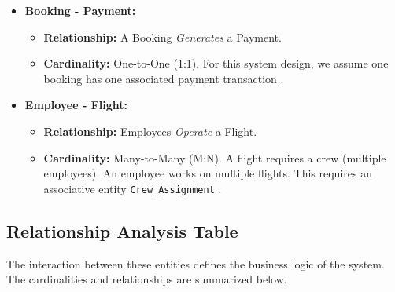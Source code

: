 \documentclass[12pt, a4paper]{article}
\begin{document}
\begin{itemize}
\begin{itemize}
			\item \textbf{Cardinality:} Binary relationship linking an Origin Airport and a Destination Airport.
		\end{itemize}
		\item \textbf{Booking - Payment:}
		\begin{itemize}
			\item \textbf{Relationship:} A Booking \textit{Generates} a Payment.
			\item \textbf{Cardinality:} One-to-One (1:1). For this system design, we assume one booking has one associated payment transaction \cite{ref29}.
		\end{itemize}
		\item \textbf{Employee - Flight:}
		\begin{itemize}
			\item \textbf{Relationship:} Employees \textit{Operate} a Flight.
			\item \textbf{Cardinality:} Many-to-Many (M:N). A flight requires a crew (multiple employees). An employee works on multiple flights. This requires an associative entity \texttt{Crew\_Assignment} \cite{ref39}.
		\end{itemize}
	\end{itemize}
	
	\subsection{Relationship Analysis Table}
	
	The interaction between these entities defines the business logic of the system. The cardinalities and relationships are summarized below.
	
\end{document}
